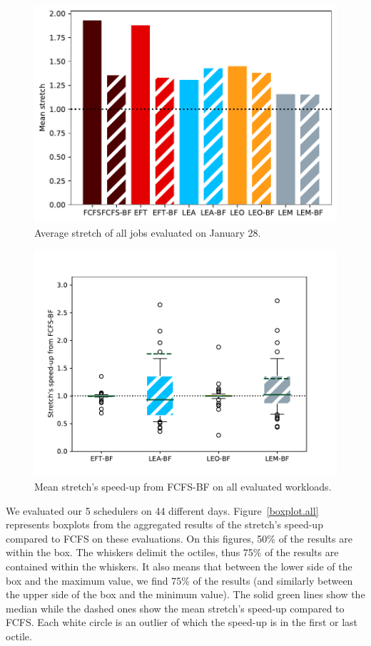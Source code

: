 \documentclass[conference,10pt]{IEEEtran}
\begin{document}
\begin{figure}[tb]\centering\includegraphics[scale=0.41]{../MBSS/plot/BF_AND_NON_BF_Results_FCFS_Score_Backfill_2022-01-28->2022-01-28_V10000_Mean_Stretch_450_128_32_256_4_1024.pdf}\caption{Average stretch of all jobs evaluated on January 28.}\label{stretch.01-28}\end{figure}
\begin{figure}\centering\includegraphics[scale=0.41]{../MBSS/plot/Boxplot/box_plot_mean_stretch_all_workloads_bf.pdf}\caption{Mean stretch's speed-up from FCFS-BF on all evaluated workloads.}\label{boxplot.all_bf}\end{figure}

We evaluated our 5 schedulers on 44 different days.
Figure~\ref{boxplot.all} represents boxplots from the aggregated
results of the stretch's speed-up compared to FCFS on these evaluations.
On this figures, 50\% of the results are within the box.
The whiskers delimit the octiles, thus 75\% of the results are contained
within the whiskers. It also means that between the lower side of the box and the maximum value,
we find 75\% of the results (and similarly between the upper side of the box and the minimum value).
The solid green lines show the median while the dashed ones show the mean stretch's speed-up compared to FCFS. 
Each white circle is an outlier of which the speed-up is in the first or last octile.
\end{document}
